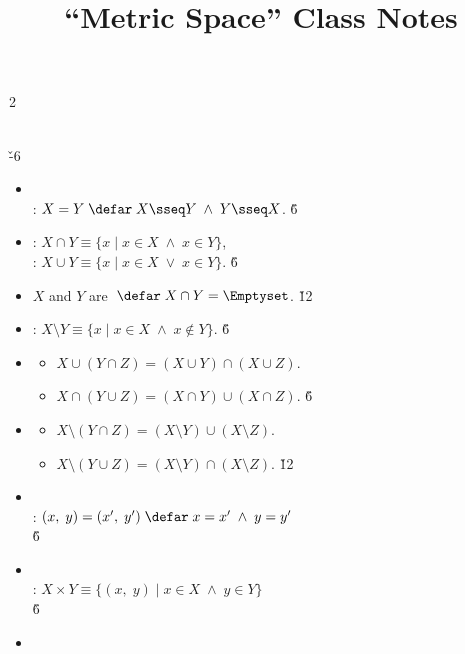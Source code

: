 \documentclass[dvipdfmx,a4paper,titlepage,9pt]{jsarticle}
\title{``Metric Space'' Class Notes}
\begin{document}
\begin{multicols*}{2}

\\
\hspace{12pt}{\small\Gray($X,\,Y$: sets)} \v{-6}
\begin{itemize}
\item[-] \\
         \;: $X=Y\;\defar\;X\sseq Y\;\wedge\;Y\sseq X$. \v6
\item[-] : $X\cap Y\equiv\{x\mid x\in X\;\wedge\;x\in Y\}$, \\
         : $X\cup Y\equiv\{x\mid x\in X\;\vee\;x\in Y\}$. \v6
\item[-] $X$ and $Y$ are $\;\defar\;X\cap Y=\Emptyset$. \v{12}
\item[-] : $X\setminus Y\equiv\{x\mid x\in X\;\wedge\;x\not\in Y\}$. \v6
\item[-] 
   \begin{itemize}
   \setlength{\leftskip}{-10pt}
   \item[$\cdot$] $X\cup(Y\cap Z)=(X\cup Y)\cap(X\cup Z).$
   \item[$\cdot$] $X\cap(Y\cup Z)=(X\cap Y)\cup(X\cap Z).$ \v6
   \end{itemize}
\item[-] 
   \begin{itemize}
   \setlength{\leftskip}{-10pt}
   \item[$\cdot$] $X\setminus(Y\cap Z)=(X\setminus Y)\cup(X\setminus Z).$
   \item[$\cdot$] $X\setminus(Y\cup Z)=(X\setminus Y)\cap(X\setminus Z).$ \v{12}
   \end{itemize}
\item[-]  \\
         \;: $(x,\;y)=(x',\;y')\;\defar\;x=x'\;\wedge\;y=y'$ \\
         \;\; \v6
\item[-]  \\
         \;: $X\times Y\equiv\{(x,\;y)\mid x\in X\;\wedge\;y\in Y\}$ \\
         \;\; \v6
\item[-] 
   \begin{itemize}

\end{itemize}
\end{itemize}
\end{multicols*}
\end{document}

